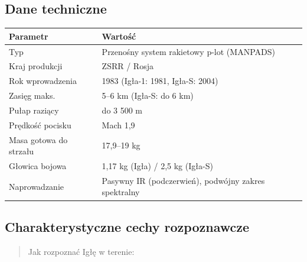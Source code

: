 \documentclass[12pt,oneside]{book}
\begin{document}
\subsection{Dane techniczne}\label{dane-techniczne-47}

\begin{longtable}[]{@{}ll@{}}
\toprule\noalign{}
Parametr & Wartość \\
\midrule\noalign{}
\endhead
\bottomrule\noalign{}
\endlastfoot
Typ & Przenośny system rakietowy p-lot (MANPADS) \\
Kraj produkcji & ZSRR / Rosja \\
Rok wprowadzenia & 1983 (Igła-1: 1981, Igła-S: 2004) \\
Zasięg maks. & 5--6 km (Igła-S: do 6 km) \\
Pułap raziący & do 3 500 m \\
Prędkość pocisku & Mach 1,9 \\
Masa gotowa do strzału & 17,9--19 kg \\
Głowica bojowa & 1,17 kg (Igła) / 2,5 kg (Igła-S) \\
Naprowadzanie & Pasywny IR (podczerwień), podwójny zakres spektralny \\
\end{longtable}

\subsection{Charakterystyczne cechy
rozpoznawcze}\label{charakterystyczne-cechy-rozpoznawcze-47}

\begin{quote}
Jak rozpoznać Igłę w terenie:
\end{quote}
\end{document}

